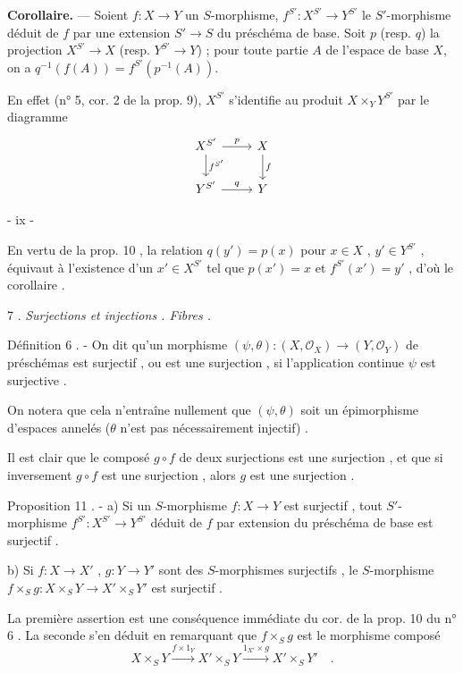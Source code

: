 \noindent \textbf{Corollaire.} — Soient $f: X \to Y$ un $S$-morphisme, $f^{S'} : X^{S'} \to Y^{S'}$ le $S'$-morphisme déduit de $f$ par une extension $S' \to S$ du préschéma de base. Soit $p$ (resp. $q$) la projection $X^{S'} \to X$ (resp. $Y^{S'} \to Y$) ; pour toute partie $A$ de l'espace de base $X$, on a $q^{-1}(f(A)) = f^{S'}(p^{-1}(A))$.

En effet (n° 5, cor. 2 de la prop. 9), $X^{S'}$ s'identifie au produit $X \times_Y Y^{S'}$ par le diagramme
$$\begin{tikzcd}
X^{S'} \arrow[r, "p"] \arrow[d, "f^{S'}"] & X \arrow[d, "f"] \\
Y^{S'} \arrow[r, "q"] & Y
\end{tikzcd}$$

\newpage


- ix -

En vertu de la prop. 10 , la relation $q(y')=p(x)$ pour $x \in X$ , $y' \in Y^{S'}$ , équivaut à l'existence d'un $x' \in X^{S'}$ tel que $p(x')=x$ et $f^{S'}(x')=y'$ , d'où le corollaire .

7 . \emph{Surjections et injections . Fibres .}

Définition 6 . - On dit qu'un morphisme $(\psi, \theta) : (X, \mathcal{O}_X) \to (Y, \mathcal{O}_Y)$ de préschémas est surjectif , ou est une surjection , si l'application continue $\psi$ est surjective .

On notera que cela n'entraîne nullement que $(\psi, \theta)$ soit un épimorphisme d'espaces annelés ($\theta$ n'est pas nécessairement injectif) .

Il est clair que le composé $g \circ f$ de deux surjections est une surjection , et que si inversement $g \circ f$ est une surjection , alors $g$ est une surjection .

Proposition 11 . - a) Si un $S$-morphisme $f : X \to Y$ est surjectif , tout $S'$-morphisme $f^{S'} : X^{S'} \to Y^{S'}$ déduit de $f$ par extension du préschéma de base est surjectif .

b) Si $f : X \to X'$ , $g : Y \to Y'$ sont des $S$-morphismes surjectifs , le $S$-morphisme $f \times_S g : X \times_S Y \to X' \times_S Y'$ est surjectif .

La première assertion est une conséquence immédiate du cor. de la prop. 10 du n° 6 . La seconde s'en déduit en remarquant que $f \times_S g$ est le morphisme composé
$$ X \times_S Y \xrightarrow{f \times 1_Y} X' \times_S Y \xrightarrow{1_{X'} \times g} X' \times_S Y' \quad . $$

